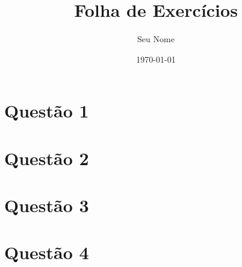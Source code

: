 \documentclass[a4paper,12pt]{article}
\title{Folha de Exercícios}
\author{Seu Nome}
\date{\today}
\begin{document}
\maketitle
\tableofcontents
\newpage

\section{Questão 1}
\lipsum[1]

\section{Questão 2}
\lipsum[2]

\section{Questão 3}
\lipsum[3]

\section{Questão 4}
\lipsum[4]
\end{document}
